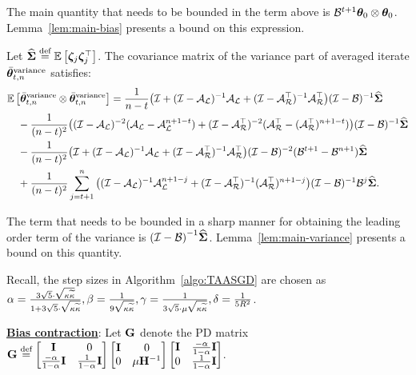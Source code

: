 The main quantity that needs to be bounded in the term above is $\BT^{t+1}\thetav_0\otimes\thetav_0$. Lemma~\ref{lem:main-bias} presents a bound on this expression. 
\begin{lemma}\label{lem:average-covar-var}
	Let $\Sighat \eqdef \E{\zetat \zetat \T}$. The covariance matrix of the variance part of averaged iterate $\thetavb^{\textrm{variance}}$ satisfies:
	\begin{align*}
	&\E{\thetavb^{\textrm{variance}} \otimes \thetavb^{\text{variance}}} = \frac{1}{n-t}\big(\eyeT + (\eyeT-\AL)^{-1}\AL + (\eyeT-\AR\T)^{-1}\AR\T\big)(\eyeT-\BT)^{-1}\Sigh	\nonumber\\
	&\quad -\frac{1}{(n-t)^2}\big((\eyeT-\AL)^{-2}(\AL-\AL^{n+1-t})+(\eyeT-\AR\T)^{-2}(\AR\T-(\AR\T)^{n+1-t})\big)(\eyeT-\BT)^{-1}\Sigh\nonumber\\
	&\quad -\frac{1}{(n-t)^2}\big(\eyeT + (\eyeT-\AL)^{-1}\AL + (\eyeT-\AR\T)^{-1}\AR\T\big)(\eyeT-\BT)^{-2}(\BT^{t+1}-\BT^{n+1})\Sigh\nonumber\\
	&\quad +\frac{1}{(n-t)^2}\sum_{j=t+1}^n\big((\eyeT-\AL)^{-1}\AL^{n+1-j}+(\eyeT-\AR\T)^{-1}(\AR\T)^{n+1-j}\big)(\eyeT-\BT)^{-1}\BT^j\Sigh.
	\end{align*}
\end{lemma}

The term that needs to be bounded in a sharp manner for obtaining the leading order term of the variance is $\inv{\left(\eyeT-\B\right)}\Sigh$. Lemma~\ref{lem:main-variance} presents a bound on this quantity. 

Recall, the step sizes in Algorithm~\ref{algo:TAASGD} are chosen as $\alpha = \frac{3\sqrt{5}\cdot\sqrt{\cnH\cnS}}{1+3\sqrt{5}\cdot\sqrt{\cnH\cnS}}, \beta = \frac{1}{9\sqrt{\cnH\cnS}}, \gamma =  \frac{1}{3\sqrt{5}\cdot \mu \sqrt{\cnH\cnS}}, \delta = \frac{1}{5R^2}$.

\noindent \underline{\textbf{Bias contraction}}: Let $\G$ denote the PD matrix $\G \eqdef \begin{bmatrix} \Id &\zero \\ \frac{-\alpha}{1-\alpha}\Id & \frac{1}{1-\alpha}\Id \end{bmatrix} \begin{bmatrix} \Id &\zero \\ \zero & {\mu}\inv{\Cov} \end{bmatrix} \begin{bmatrix} \Id & \frac{-\alpha}{1-\alpha}\Id \\ \zero & \frac{1}{1-\alpha}\Id \end{bmatrix}$. 

